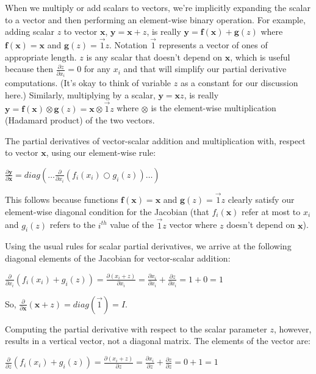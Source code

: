 \documentclass[11pt]{article}
\begin{document}
When we multiply or add scalars to vectors, we're implicitly expanding the scalar to a vector and then performing an element-wise binary operation. For example, adding scalar $z$  to vector $\mathbf{x}$, $\mathbf{y} = \mathbf{x} + z$,
is really
$\mathbf{y} = \mathbf{f(x)} + \mathbf{g}(z)$ where $\mathbf{f(x)} = \mathbf{x}$ and $\mathbf{g}(z) = \vec{1} z$. Notation $\vec{1}$ represents a vector of ones of appropriate length.  $z$ is any scalar that doesn't depend on $\mathbf{x}$, which is useful because then $\frac{\partial z}{\partial x_i} = 0$ for any $x_i$ and that will simplify our partial derivative computations. (It's okay to think of variable $z$ as a constant for our discussion here.)  Similarly, multiplying by a scalar, $\mathbf{y} = \mathbf{x} z$, is really $\mathbf{y} = \mathbf{f(x)} \otimes \mathbf{g}(z) = \mathbf{x} \otimes \vec{1}z$ where $\otimes$ is the element-wise  multiplication (Hadamard product) of the two vectors.

The partial derivatives of vector-scalar addition and multiplication with, respect to vector $\mathbf{x}$, using our element-wise rule:

$\frac{\partial \mathbf{y}}{\partial \mathbf{x}} = diag \left( \ldots \frac{\partial}{\partial x_i} ( f_i(x_i) \bigcirc g_i(z) ) \ldots \right)$

This follows because functions $\mathbf{f(x)} = \mathbf{x}$ and $\mathbf{g}(z) = \vec{1} z$ clearly satisfy our element-wise diagonal condition for the Jacobian (that $f_i(\mathbf{x})$ refer at most to $x_i$ and $g_i(z)$ refers to the $i^{th}$ value of the $\vec{1}z$ vector where $z$ doesn't depend on $\mathbf{x}$). 

Using the usual rules for scalar partial derivatives, we arrive at the following diagonal elements of the Jacobian for vector-scalar addition:
 
$\frac{\partial}{\partial x_i} ( f_i(x_i) + g_i(z) ) = \frac{\partial (x_i + z)}{\partial x_i} = \frac{\partial x_i}{\partial x_i} + \frac{\partial z}{\partial x_i} = 1 + 0 = 1$

So, $\frac{\partial}{\partial \mathbf{x}} ( \mathbf{x} + z ) = diag(\vec{1}) = I$.

Computing the partial derivative with respect to the scalar parameter $z$, however, results in a vertical vector, not a diagonal matrix. The elements of the vector are:
 
$\frac{\partial}{\partial z} ( f_i(x_i) + g_i(z) ) = \frac{\partial (x_i + z)}{\partial z} = \frac{\partial x_i}{\partial z} + \frac{\partial z}{\partial z} = 0 + 1 = 1$
\end{document}
